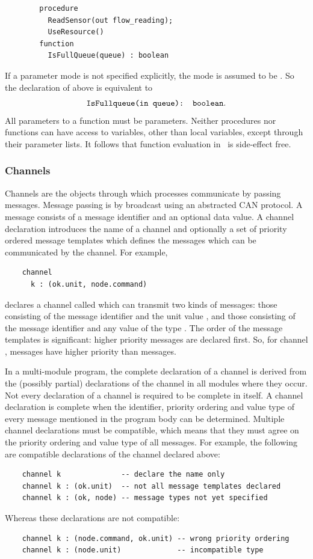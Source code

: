 \begin{verbatim}
        procedure 
          ReadSensor(out flow_reading);
          UseResource()
        function 
          IsFullQueue(queue) : boolean
\end{verbatim}
If a parameter mode is not specified explicitly, the mode is assumed to be
. So the declaration of  above is equivalent
to 
\[\mbox{\tt IsFullqueue(in queue): boolean}.\]
All parameters to a function must be  parameters. Neither
procedures nor functions can have access to variables, other than
local variables, except through their parameter lists. It follows that
function evaluation in \candle\ is side-effect free.

\subsubsection{Channels}
Channels are the objects through which processes communicate by
passing messages.  Message passing is by broadcast using an abstracted
CAN protocol.  A message consists of a message identifier and an
optional data value.  A channel declaration introduces the name of a
channel and optionally a set of priority ordered message templates
which defines the messages which can be communicated by the
channel. For example,
\begin{verbatim}
    channel
      k : (ok.unit, node.command)
\end{verbatim}
declares a channel called  which can transmit two kinds of messages: 
those consisting of the message identifier  and the unit value 
\trm{\unitval}, and those consisting of the message identifier 
and any value of the type . The order of the message
templates is significant: higher priority messages are declared first.
So, for channel ,  messages have higher priority than
 messages.

In a multi-module program, the complete declaration of a channel is
derived from the (possibly partial) declarations of the channel in 
all modules where they occur. Not every declaration of a channel is required
to be complete in itself. A channel declaration is complete when
the identifier, priority ordering and value type of every message
mentioned in the program body can be determined. Multiple channel
declarations must be compatible, which means that they must agree on
the priority ordering and value type of all messages.
\label{page:prchannelcompat} For example, the
following are compatible declarations of the channel  declared
above:
\begin{verbatim}
    channel k              -- declare the name only
    channel k : (ok.unit)  -- not all message templates declared
    channel k : (ok, node) -- message types not yet specified
\end{verbatim}
Whereas these declarations are not compatible:
\begin{verbatim}
    channel k : (node.command, ok.unit) -- wrong priority ordering
    channel k : (node.unit)             -- incompatible type
\end{verbatim}
    
